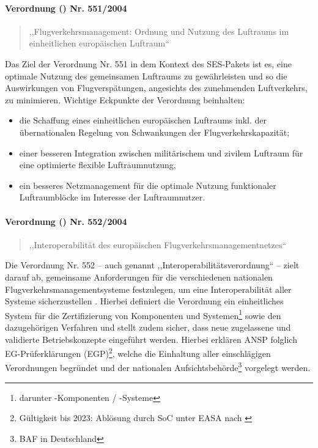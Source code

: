 \paragraph{Verordnung () Nr. 551/2004} \label{er_551}
    \begin{quote}
        ,,Flugverkehrsmanagement: Ordnung und Nutzung des Luftraums im einheitlichen europäischen Luftraum``
        \cite{2004R0551, 2004R0551_summary}
    \end{quote}

    \noindent
    Das Ziel der Verordnung Nr. 551 in dem Kontext des \ac{SES}-Pakets ist es, eine optimale Nutzung des gemeinsamen Luftraums zu gewährleisten und so die Auswirkungen von Flugverspätungen, angesichts des zunehmenden Luftverkehrs, zu minimieren. 
    Wichtige Eckpunkte der Verordnung beinhalten: 
    
    \begin{itemize}
        \item die Schaffung eines einheitlichen europäischen Luftraums inkl. der übernationalen Regelung von Schwankungen der Flugverkehrskapazität;
        \item  einer besseren Integration zwischen militärischem und zivilem Luftraum für eine optimierte flexible Luftraumnutzung,
        \item ein besseres Netzmanagement für die optimale Nutzung funktionaler Luftraumblöcke im Interesse der Luftraumnutzer. \cite{2004R0551_summary}
    \end{itemize}

\paragraph{Verordnung () Nr. 552/2004} \label{er_552}
    \begin{quote}
        ,,Interoperabilität des europäischen Flugverkehrsmanagement\-netzes``
        \cite{2004R0552, 2004R0552_summary}
    \end{quote}
    
    \noindent
    Die Verordnung Nr. 552 -- auch genannt ,,Interoperabilitätsverordnung`` -- zielt darauf ab, gemeinsame Anforderungen für die verschiedenen nationalen Flugverkehrsmanagementsysteme festzulegen, um eine Interoperabilität aller Systeme sicherzustellen
    \cite{2004R0552_summary}.
    Hierbei definiert die Verordnung ein einheitliches System für die Zertifizierung von Komponenten und Systemen\footnote{darunter \atmans-Komponenten / -Systeme} sowie den dazugehörigen Verfahren und stellt zudem sicher, dass neue zugelassene und validierte Betriebskonzepte eingeführt werden. \cite[Art.3 Abs.1]{2004R0552}
    Hierbei erklären \ac{ANSP} folglich \acs{EG}-Prüferklärungen (\acs{EGP})\footnote{Gültigkeit bis 2023: Ablösung durch \ac{SoC} unter \acs{EASA} nach  \cite{2023R1769}}, welche die Einhaltung aller einschlägigen Verordnungen begründet und der nationalen Aufsichtsbehörde\footnote{\acf{BAF} in Deutschland} vorgelegt werden. \cite[Art. 6 Abs. 1f]{2004R0552}

